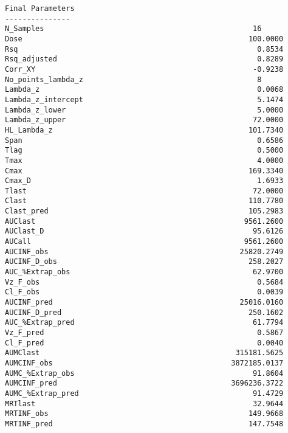 \documentclass[12pt,a4paper]{article}
\begin{document}
\begin{verbatim}
Final Parameters
---------------
N_Samples                                                16
Dose                                                    100.0000
Rsq                                                       0.8534
Rsq_adjusted                                              0.8289
Corr_XY                                                  -0.9238
No_points_lambda_z                                        8
Lambda_z                                                  0.0068
Lambda_z_intercept                                        5.1474
Lambda_z_lower                                            5.0000
Lambda_z_upper                                           72.0000
HL_Lambda_z                                             101.7340
Span                                                      0.6586
Tlag                                                      0.5000
Tmax                                                      4.0000
Cmax                                                    169.3340
Cmax_D                                                    1.6933
Tlast                                                    72.0000
Clast                                                   110.7780
Clast_pred                                              105.2983
AUClast                                                9561.2600
AUClast_D                                                95.6126
AUCall                                                 9561.2600
AUCINF_obs                                            25820.2749
AUCINF_D_obs                                            258.2027
AUC_%Extrap_obs                                          62.9700
Vz_F_obs                                                  0.5684
Cl_F_obs                                                  0.0039
AUCINF_pred                                           25016.0160
AUCINF_D_pred                                           250.1602
AUC_%Extrap_pred                                         61.7794
Vz_F_pred                                                 0.5867
Cl_F_pred                                                 0.0040
AUMClast                                             315181.5625
AUMCINF_obs                                         3872185.0137
AUMC_%Extrap_obs                                         91.8604
AUMCINF_pred                                        3696236.3722
AUMC_%Extrap_pred                                        91.4729
MRTlast                                                  32.9644
MRTINF_obs                                              149.9668
MRTINF_pred                                             147.7548




\end{verbatim}
\end{document}
